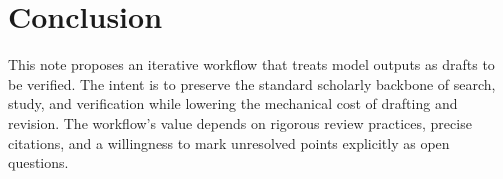 \documentclass[11pt,a4paper]{article}
\theoremstyle{definition}
\theoremstyle{remark}
\begin{document}
\section{Conclusion}
\label{sec:conclusion}

This note proposes an iterative workflow that treats model outputs as drafts to be verified. The intent is to preserve the standard scholarly backbone of search, study, and verification while lowering the mechanical cost of drafting and revision. The workflow’s value depends on rigorous review practices, precise citations, and a willingness to mark unresolved points explicitly as open questions.



\end{document}
